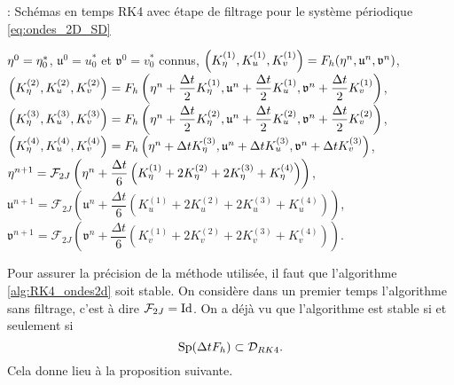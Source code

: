 \begin{center}
\begin{minipage}[H]{12cm}
  \begin{algorithm}[H]
    \caption{: Schémas en temps RK4 avec étape de filtrage pour le système périodique \eqref{eq:ondes_2D_SD}}\label{alg:RK4_ondes2d}
    \begin{algorithmic}[1]
    \State $\mathbf{\eta}^0 = \eta_0^*$, $\mathfrak{u}^0 = u_0^*$ et $\mathfrak{v}^0 = v_0^*$ connus,
             \State  $\left(K^{(1)}_{\eta}, K^{(1)}_{u}, K^{(1)}_{v}\right) = F_h(\mathbf{\eta}^n, \mathfrak{u}^n, \mathfrak{v}^n)$,
             \State  $\left(K^{(2)}_{\eta}, K^{(2)}_{u}, K^{(2)}_{v}\right) = F_h\left(\mathbf{\eta}^n + \dfrac{\Delta t}{2}K^{(1)}_{\eta}, \mathfrak{u}^n + \dfrac{\Delta t}{2}K^{(1)}_{u}, \mathfrak{v}^n + \dfrac{\Delta t}{2}K^{(1)}_{v}\right)$,
             \State   $\left(K^{(3)}_{\eta}, K^{(3)}_{u}, K^{(3)}_{v}\right) = F_h\left(\mathbf{\eta}^n + \dfrac{\Delta t}{2}K^{(2)}_{\eta}, \mathfrak{u}^n + \dfrac{\Delta t}{2}K^{(2)}_{u}, \mathfrak{v}^n + \dfrac{\Delta t}{2}K^{(2)}_{v}\right)$,
             \State   $\left(K^{(4)}_{\eta}, K^{(4)}_{u}, K^{(4)}_{v}\right) = F_h\left(\mathbf{\eta}^n + \Delta t K^{(3)}_{\eta}, \mathfrak{u}^n + \Delta tK^{(3)}_{u}, \mathfrak{v}^n + \Delta t K^{(3)}_{v}\right)$,
             \State  $\mathbf{\eta}^{n+1} = \mathcal{F}_{2J}\left( \mathbf{\eta}^n  + \dfrac{\Delta t}{6} \left( K^{(1)}_{\eta} + 2 K^{(2)}_{\eta} + 2 K^{(3)}_{\eta} + K^{(4)}_{\eta} \right) \right)$,
             \State  $\mathfrak{u}^{n+1} = \mathcal{F}_{2J}\left( \mathfrak{u}^n  + \dfrac{\Delta t}{6} \left( K^{(1)}_{u} + 2 K^{(2)}_{u} + 2 K^{(3)}_{u} + K^{(4)}_{u} \right) \right)$,
             \State  $\mathfrak{v}^{n+1} = \mathcal{F}_{2J}\left( \mathfrak{v}^n  + \dfrac{\Delta t}{6} \left( K^{(1)}_{v} + 2 K^{(2)}_{v} + 2 K^{(3)}_{v} + K^{(4)}_{v} \right) \right)$.
            \EndFor
    \end{algorithmic}
    \end{algorithm}
\end{minipage}
\end{center}











Pour assurer la précision de la méthode utilisée, il faut que l'algorithme \eqref{alg:RK4_ondes2d} soit stable. On considère dans un premier temps l'algorithme sans filtrage, c'est à dire $\mathcal{F}_{2J}=\text{Id}$. On a déjà vu que l'algorithme est stable si et seulement si
\begin{equation}
\text{Sp} ( \Delta t F_h ) \subset \mathcal{D}_{RK4}.
\end{equation}
Cela donne lieu à la proposition suivante.

